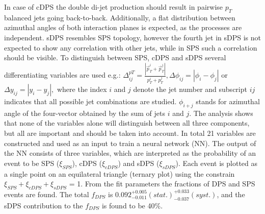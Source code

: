 \documentclass{ws-rv9x6}
\begin{document}
In case of cDPS the double di-jet production should result in pairwise $p_T$ balanced jets going back-to-back. Additionally, a flat distribution between azimuthal angles  of both interaction planes is expected, as the processes are independent. sDPS resembles SPS topology, however the fourth jet in sDPS is not expected to show any correlation with other jets, while in SPS such a correlation should be visible.
To distinguish between SPS, cDPS and sDPS several differentiating variables are used e.g.:
$\Delta_{ij}^{pT} = \frac{|\vec{p}_T^i + \vec{p}_T^j|}{p_T^i+p_T^j}, \Delta\phi_{ij} = |\phi_i - \phi_j|$ or $\Delta y_{ij}= |y_i-y_j|,$ 
where the index $i$ and $j$ denote the jet number and subscript $ij$ indicates that all possible jet combinations are studied. 
$\phi_{i+j}$ stands for azimuthal angle of the four-vector obtained by the sum of jets $i$ and $j$.
The analysis shows that none of the variables alone will distinguish between all three components, but all are important and should be taken into account. In total 21 variables are constructed and used as an input to train a neural network (NN). The output of the NN consists of three variables, which are interpreted as the probability of an event to be SPS ($\xi_{SPS}$), cDPS ($\xi_{cDPS}$) and sDPS ($\xi_{sDPS}$). 
Each event is plotted as a single point on an equilateral triangle (ternary plot) using the constrain $\xi_{SPS}+\xi_{cDPS}+\xi_{sDPS}$ = 1. 
From the fit parameters the fractions of DPS and SPS events are found. The total $f_{D\!P\!S}$ is $0.092^{+0.005}_{-0.011}(stat.)^{+0.033}_{-0.037}(syst.)$, and the sDPS contribution to the $f_{D\!P\!S}$ is found to be 40\%. 
\end{document}
